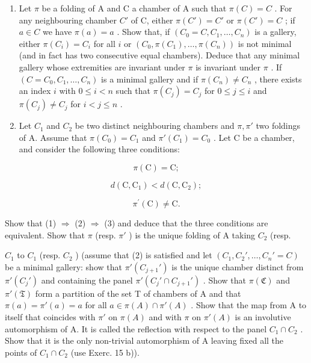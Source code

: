 \begin{enumerate}
\def\labelenumi{\alph{enumi})}
\item
  Let \(\pi\) be a folding of A and C a chamber of A such that \(\pi(C) = C\) . For any neighbouring chamber \(C'\) of C, either \(\pi(C') = C'\) or \(\pi(C') = C\) ; if \(a \in C\) we have \(\pi(a) = a\) . Show that, if \((C_0 = C, C_1, \ldots, C_n)\) is a gallery, either \(\pi(C_i) = C_i\) for all \(i\) or \((C_0, \pi(C_1), \ldots, \pi(C_n))\) is not minimal (and in fact has two consecutive equal chambers). Deduce that any minimal gallery whose extremities are invariant under \(\pi\) is invariant under \(\pi\) . If \((C = C_0, C_1, \ldots, C_n)\) is a minimal gallery and if \(\pi(C_n) \neq C_n\) , there exists an index \(i\) with \(0 \leqslant i < n\) such that \(\pi(C_j) = C_j\) for \(0 \leqslant j \leqslant i\) and \(\pi(C_j) \neq C_j\) for \(i < j \leqslant n\) .
\item
  Let \(C_{1}\) and \(C_{2}\) be two distinct neighbouring chambers and \(\pi, \pi'\) two foldings of A. Assume that \(\pi(C_{0}) = C_{1}\) and \(\pi'(C_{1}) = C_{0}\) . Let C be a chamber, and consider the following three conditions:
\end{enumerate}

\[
\pi (\mathrm{C}) = \mathrm{C};\tag{1}
\]

\[
d (\mathrm{C}, \mathrm{C} _ {1}) <   d (\mathrm{C}, \mathrm{C} _ {2});\tag{2}
\]

\[
\pi^ {\prime} (\mathrm{C}) \neq \mathrm{C}.\tag{3}
\]

Show that (1) \(\Longrightarrow\) (2) \(\Longrightarrow\) (3) and deduce that the three conditions are equivalent. Show that \(\pi\) (resp. \(\pi'\) ) is the unique folding of A taking \(C_2\) (resp.

\(C_{1}\) to \(C_{1}\) (resp. \(C_{2}\) ) (assume that (2) is satisfied and let \((C_{1}, C_{2}', \ldots, C_{n}' = C)\) be a minimal gallery: show that \(\pi'(C_{j+1}')\) is the unique chamber distinct from \(\pi'(C_{j}')\) and containing the panel \(\pi'(C_{j}' \cap C_{j+1}')\) . Show that \(\pi(\mathfrak{C})\) and \(\pi'(\mathfrak{T})\) form a partition of the set T of chambers of A and that \(\pi(a) = \pi'(a) = a\) for all \(a \in \pi(A) \cap \pi'(A)\) . Show that the map from A to itself that coincides with \(\pi'\) on \(\pi(A)\) and with \(\pi\) on \(\pi'(A)\) is an involutive automorphism of A. It is called the reflection with respect to the panel \(C_{1} \cap C_{2}\) . Show that it is the only non-trivial automorphism of A leaving fixed all the points of \(C_{1} \cap C_{2}\) (use Exerc. 15 b)).

